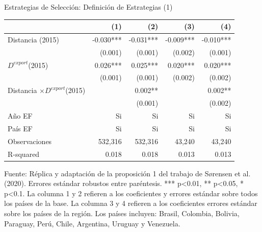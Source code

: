 \documentclass{beamer}
\begin{document}
\begin{frame}{Estrategias de Selección: Definición de Estrategias (1)}
    \begin{table}[!ht]
    \centering
    \vspace{-0.2cm}{Tabla A1: Efecto de la distancia y exportaciones en la aparición de producto}
    \begin{adjustbox}{width=0.9\textwidth,margin=0.9cm}

    \begin{tabular}{lrrrr}
        \toprule
        & (1) & (2) & (3) & (4)\\ 
        \midrule
        Distancia (2015) & -0.030*** & -0.031*** & -0.009*** & -0.010*** \\
        & (0.001) & (0.001) & (0.002) & (0.001) \\
        $D^{export}$(2015) & 0.026*** & 0.025*** & 0.020*** & 0.020*** \\
        & (0.001) & (0.001) & (0.002) & (0.002) \\
        Distancia $\times D^{export}$(2015) & & 0.002** & & 0.002** \\
        & & (0.001) & & (0.002) \\
        \midrule
        Año EF & Si & Si & Si & Si \\
        País EF & Si & Si & Si & Si \\
        Observaciones & 532,316 & 532,316 & 43,240 & 43,240 \\
        R-squared & 0.018 & 0.018 & 0.013 & 0.013 \\
        \bottomrule
    \end{tabular}
    \end{adjustbox}

    \vspace{0.2cm}
    \tiny{Fuente: Réplica y adaptación de la proposición 1 del trabajo de Sørensen et al.(2020). Errores estándar robustos entre paréntesis. *** p\textless0.01, ** p\textless0.05, * p\textless0.1. La columna 1 y 2 refieren a los coeficientes y errores estándar sobre todos los países de la base. La columna 3 y 4 refieren a los coeficientes errores estándar sobre los países de la región. Los países incluyen: Brasil, Colombia, Bolivia, Paraguay, Perú, Chile, Argentina, Uruguay y Venezuela.}
    \end{table}
\end{frame}
\end{document}
